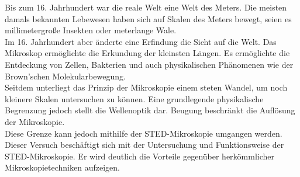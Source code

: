 Bis zum 16. Jahrhundert war die reale Welt eine Welt des Meters. 
Die meisten damals bekannten Lebewesen haben sich auf Skalen des Meters bewegt, seien es millimetergroße Insekten oder meterlange Wale.
\\
Im 16. Jahrhundert aber änderte eine Erfindung die Sicht auf die Welt. 
Das Mikroskop ermöglichte die Erkundung der kleinsten Längen. 
Es ermöglichte die Entdeckung von Zellen, Bakterien und auch physikalischen Phänomenen wie der Brown'schen Molekularbewegung.
\\
Seitdem unterliegt das Prinzip der Mikroskopie einem steten Wandel, um noch kleinere Skalen untersuchen zu können.
Eine grundlegende physikalische Begrenzung jedoch stellt die Wellenoptik dar.
Beugung beschränkt die Auflösung der Mikroskopie.
\\
Diese Grenze kann jedoch mithilfe der STED-Mikroskopie umgangen werden. 
\\
Dieser Versuch beschäftigt sich mit der Untersuchung und Funktionsweise der STED-Mikroskopie. Er wird deutlich die Vorteile gegenüber herkömmlicher Mikroskopietechniken aufzeigen.

